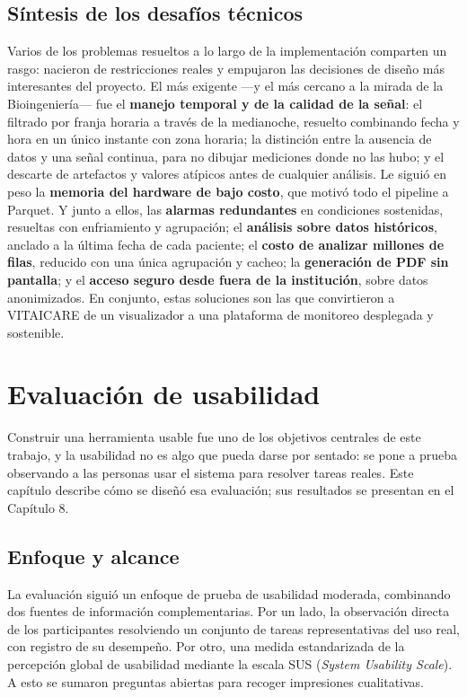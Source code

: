 \subsection{Síntesis de los desafíos técnicos}
Varios de los problemas resueltos a lo largo de la implementación comparten un rasgo: nacieron de restricciones reales y empujaron las decisiones de diseño más interesantes del proyecto. El más exigente —y el más cercano a la mirada de la Bioingeniería— fue el \textbf{manejo temporal y de la calidad de la señal}: el filtrado por franja horaria a través de la medianoche, resuelto combinando fecha y hora en un único instante con zona horaria; la distinción entre la ausencia de datos y una señal continua, para no dibujar mediciones donde no las hubo; y el descarte de artefactos y valores atípicos antes de cualquier análisis. Le siguió en peso la \textbf{memoria del hardware de bajo costo}, que motivó todo el pipeline a Parquet. Y junto a ellos, las \textbf{alarmas redundantes} en condiciones sostenidas, resueltas con enfriamiento y agrupación; el \textbf{análisis sobre datos históricos}, anclado a la última fecha de cada paciente; el \textbf{costo de analizar millones de filas}, reducido con una única agrupación y cacheo; la \textbf{generación de PDF sin pantalla}; y el \textbf{acceso seguro desde fuera de la institución}, sobre datos anonimizados. En conjunto, estas soluciones son las que convirtieron a VITAICARE de un visualizador a una plataforma de monitoreo desplegada y sostenible.\\


\section{Evaluación de usabilidad}
Construir una herramienta usable fue uno de los objetivos centrales de este trabajo, y la usabilidad no es algo que pueda darse por sentado: se pone a prueba observando a las personas usar el sistema para resolver tareas reales. Este capítulo describe cómo se diseñó esa evaluación; sus resultados se presentan en el Capítulo 8.\\


\subsection{Enfoque y alcance}
La evaluación siguió un enfoque de prueba de usabilidad moderada, combinando dos fuentes de información complementarias. Por un lado, la observación directa de los participantes resolviendo un conjunto de tareas representativas del uso real, con registro de su desempeño. Por otro, una medida estandarizada de la percepción global de usabilidad mediante la escala SUS (\textit{System Usability Scale}). A esto se sumaron preguntas abiertas para recoger impresiones cualitativas.\\

